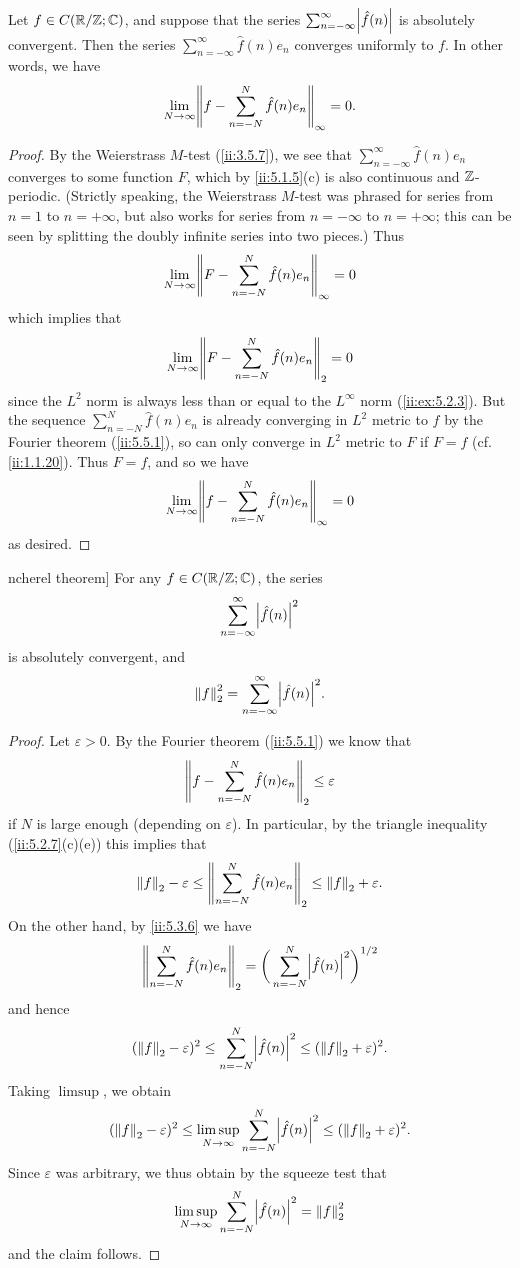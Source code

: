 \begin{thm}\label{ii:5.5.3}
  Let \(f \in C(\R / \Z ; \C)\), and suppose that the series \(\sum_{n = -\infty}^\infty \abs{\hat{f}(n)}\) is absolutely convergent.
  Then the series \(\sum_{n = -\infty}^\infty \hat{f}(n) e_n\) converges uniformly to \(f\).
  In other words, we have
  \[
    \lim_{N \to \infty} \norm*{f - \sum_{n = -N}^N \hat{f}(n) e_n}_{\infty} = 0.
  \]
\end{thm}

\begin{proof}
  By the Weierstrass \(M\)-test (\cref{ii:3.5.7}), we see that \(\sum_{n = -\infty}^\infty \hat{f}(n) e_n\) converges to some function \(F\), which by \cref{ii:5.1.5}(c) is also continuous and \(\Z\)-periodic.
  (Strictly speaking, the Weierstrass \(M\)-test was phrased for series from \(n = 1\) to \(n = +\infty\), but also works for series from \(n = -\infty\) to \(n = +\infty\);
  this can be seen by splitting the doubly infinite series into two pieces.)
  Thus
  \[
    \lim_{N \to \infty} \norm*{F - \sum_{n = -N}^N \hat{f}(n) e_n}_{\infty} = 0
  \]
  which implies that
  \[
    \lim_{N \to \infty} \norm*{F - \sum_{n = -N}^N \hat{f}(n) e_n}_2 = 0
  \]
  since the \(L^2\) norm is always less than or equal to the \(L^\infty\) norm (\cref{ii:ex:5.2.3}).
  But the sequence \(\sum_{n = -N}^N \hat{f}(n) e_n\) is already converging in \(L^2\) metric to \(f\) by the Fourier theorem (\cref{ii:5.5.1}), so can only converge in \(L^2\) metric to \(F\) if \(F = f\)
  (cf. \cref{ii:1.1.20}).
  Thus \(F = f\), and so we have
  \[
    \lim_{N \to \infty} \norm*{f - \sum_{n = -N}^N \hat{f}(n) e_n}_{\infty} = 0
  \]
  as desired.
\end{proof}

\begin{thm}ncherel theorem]\label{ii:5.5.4}
  For any \(f \in C(\R / \Z ; \C)\), the series
  \[
    \sum_{n = -\infty}^\infty \abs{\hat{f}(n)}^2
  \]
  is absolutely convergent, and
  \[
    \norm*{f}_2^2 = \sum_{n = -\infty}^\infty \abs{\hat{f}(n)}^2.
  \]
\end{thm}

\begin{proof}
  Let \(\varepsilon > 0\).
  By the Fourier theorem (\cref{ii:5.5.1}) we know that
  \[
    \norm*{f - \sum_{n = -N}^N \hat{f}(n) e_n}_2 \leq \varepsilon
  \]
  if \(N\) is large enough (depending on \(\varepsilon\)).
  In particular, by the triangle inequality (\cref{ii:5.2.7}(c)(e)) this implies that
  \[
    \norm*{f}_2 - \varepsilon \leq \norm*{\sum_{n = -N}^N \hat{f}(n) e_n}_2 \leq \norm*{f}_2 + \varepsilon.
  \]
  On the other hand, by \cref{ii:5.3.6} we have
  \[
    \norm*{\sum_{n = -N}^N \hat{f}(n) e_n}_2 = \bigg(\sum_{n = -N}^N \abs{\hat{f}(n)}^2\bigg)^{1 / 2}
  \]
  and hence
  \[
    (\norm*{f}_2 - \varepsilon)^2 \leq \sum_{n = -N}^N \abs{\hat{f}(n)}^2 \leq (\norm*{f}_2 + \varepsilon)^2.
  \]
  Taking \(\limsup\), we obtain
  \[
    (\norm*{f}_2 - \varepsilon)^2 \leq \limsup_{N \to \infty} \sum_{n = -N}^N \abs{\hat{f}(n)}^2 \leq (\norm*{f}_2 + \varepsilon)^2.
  \]
  Since \(\varepsilon\) was arbitrary, we thus obtain by the squeeze test that
  \[
    \limsup_{N \to \infty} \sum_{n = -N}^N \abs{\hat{f}(n)}^2 = \norm*{f}_2^2
  \]
  and the claim follows.
\end{proof}

